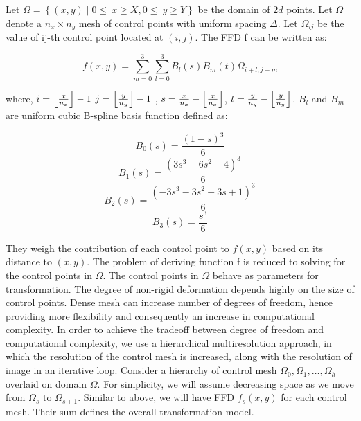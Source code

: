 Let $\Omega  = \left\{(x,y)\mid 0 \leq\ x \geq X, 0 \leq\ y \geq Y \right\}$ be the domain of $2d$ points. Let $\Omega$ denote a $n_{x}\times n_{y}$ mesh of control points with uniform spacing $\Delta$. Let $\Omega_{ij}$ be the value of ij-th control point located at $(i,j)$. The FFD f can be written as:

\begin{equation}
f(x,y) = \sum_{m=0}^{3}\sum_{l=0}^{3}B_{l}(s)B_{m}(t)\Omega_{i+l,j+m}
\end{equation}	

where, 
$i = \floor*{\frac{x}{n_{x}}} - 1$ 
$j = \floor*{\frac{y}{n_{y}}} - 1$ ,
$s = \frac{x}{n_{x}} - \floor*{\frac{x}{n_{x}}}$,
$t = \frac{y}{n_{y}} - \floor*{\frac{y}{n_{y}}}$.
$B_{l}$ and $B_{m}$ are uniform cubic B-spline basis function defined as:

\begin{equation}
B_{0}(s)=  \frac{(1-s)^{3}}{6}
\end{equation}	
\begin{equation}
B_{1}(s)=  \frac{(3s^{3}-6s^{2}+4)^{3}}{6}
\end{equation}	
\begin{equation}
B_{2}(s)=  \frac{(-3s^{3}-3s^{2}+3s+1)^{3}}{6}
\end{equation}	
\begin{equation}
B_{3}(s)=  \frac{s^{3}}{6}
\end{equation}	

They weigh the contribution of each control point to $f(x,y)$ based on its distance to $(x,y)$. The problem of deriving function f is reduced to solving for the control points in $\Omega$. The control points in $\Omega$ behave as parameters for transformation. The degree of non-rigid deformation depends highly on the size of control points. Dense mesh can increase number of degrees of freedom, hence providing more flexibility and consequently an increase in computational complexity. In order to achieve the tradeoff between degree of freedom and computational complexity, we use a hierarchical multiresolution \cite{Lee97} approach, in which the resolution of the control mesh is increased, along with the resolution of image in an iterative loop. Consider a hierarchy of control mesh $\Omega_{0}, \Omega_{1},\ldots,\Omega_{h}$ overlaid on domain $\Omega$. For simplicity, we will assume decreasing space as we move from $\Omega_{s}$ to $\Omega_{s+1}$. Similar to above, we will have FFD $f_{s}(x,y)$ for each control mesh. Their sum defines the overall transformation model.

